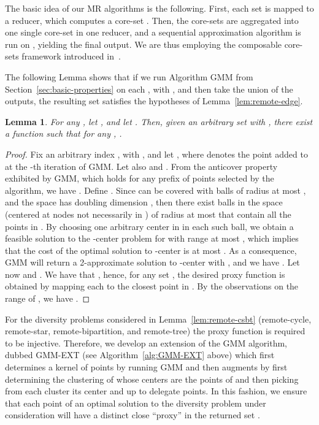 \documentclass{article}
\newtheorem{lemma}{Lemma}
\begin{document}
The basic idea of our MR algorithms is the following. First, each set
 is mapped to a reducer, which computes a core-set
.  Then, the core-sets are aggregated into one
single core-set  in one reducer, and a
sequential approximation algorithm is run on , yielding the final
output.  We are thus employing the composable core-sets framework
introduced in~\cite{IndykMMM14}.

The following Lemma shows that if we run Algorithm {\sc GMM} 
from Section~\ref{sec:basic-properties} on
each , with , and then take the union of the
outputs, the resulting set satisfies the hypotheses of
Lemma~\ref{lem:remote-edge}.

\begin{lemma}\label{lem:gmm-properties}
  For any , let , and
  let . Then, given
  an arbitrary set  with , there exist a
  function  such that for any ,
  .
\end{lemma}
\begin{proof}
  Fix an arbitrary index , with , and let
  , where  denotes the point
  added to  at the -th iteration of {\sc GMM}. Let
  also  and
  . From the anticover property
  exhibited by GMM, which holds for any prefix of points selected by
  the algorithm, we have
  .  Define
  . Since  can be covered with  balls
  of radius at most , and the space has doubling dimension ,
  then there exist  balls in the space (centered at nodes not
  necessarily in ) of radius at most  that
  contain all the points in . By choosing one arbitrary center in
   in each such ball, we obtain a feasible solution to the
  -center problem for  with range at most ,
  which implies that the cost of the optimal solution to -center
  is at most . As a consequence, {\sc GMM}
  will return a 2-approximate solution  to -center with
  , and we have
  . Let now
   and . We have that , hence, for any
  set , the desired proxy function  is
  obtained by mapping each  to the closest point in . By
  the observations on the range of , we have
  .
\end{proof}

For the diversity problems considered in Lemma~\ref{lem:remote-csbt}
(remote-cycle, remote-star, remote-bipartition, and remote-tree) the
proxy function is required to be injective. Therefore, we develop an
extension of the {\sc GMM} algorithm, dubbed {\sc GMM-EXT} (see
Algorithm~\ref{alg:GMM-EXT} above) which first determines a kernel
 of  points by running {\sc GMM} and then
augments  by first determining the clustering of  whose centers
are the points of  and then picking from each cluster its center
and up to  delegate points.  In this fashion, we ensure that each
point of an optimal solution to the diversity problem under
consideration will have a distinct close ``proxy'' in the returned set
.
\end{document}
